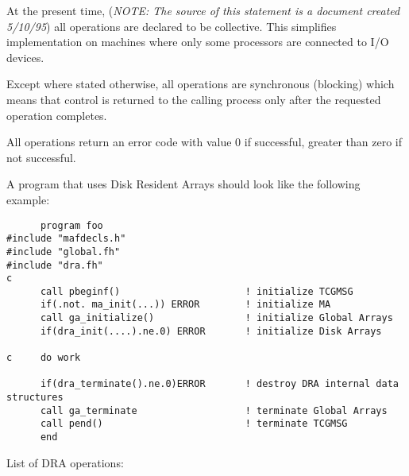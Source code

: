 At the  present time, ({\em NOTE: The source of this statement is a document
created 5/10/95}) all operations are declared to be collective. 
This simplifies implementation on machines where only some processors 
are connected to I/O devices. 

Except where stated otherwise, all operations are synchronous (blocking)
which means that control is returned to the calling process only after
the requested operation completes. 

All operations return an error code with value 0 if successful, greater than
zero if not successful.

A program that uses Disk Resident Arrays should look like the following example:

\begin{verbatim}
      program foo
#include "mafdecls.h"
#include "global.fh"
#include "dra.fh"
c
      call pbeginf()                      ! initialize TCGMSG
      if(.not. ma_init(...)) ERROR        ! initialize MA
      call ga_initialize()                ! initialize Global Arrays
      if(dra_init(....).ne.0) ERROR       ! initialize Disk Arrays 

c     do work

      if(dra_terminate().ne.0)ERROR       ! destroy DRA internal data structures
      call ga_terminate                   ! terminate Global Arrays
      call pend()                         ! terminate TCGMSG
      end
\end{verbatim}


      
List of DRA operations:

